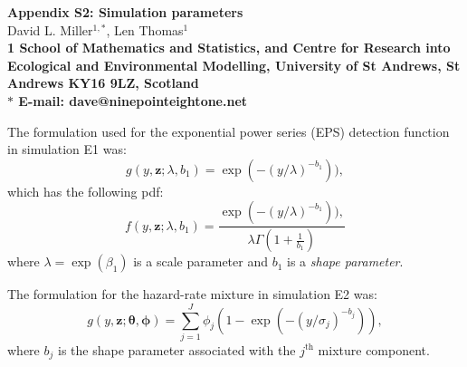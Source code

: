 \documentclass[10pt]{article}
\date{}
\begin{document}
\begin{flushleft}
{\Large
\textbf{Appendix S2: Simulation parameters}
}
\\
David L. Miller$^{1,\ast}$,
Len Thomas$^{1}$
\\
\bf{1} School of Mathematics and Statistics, and Centre for Research into Ecological and Environmental Modelling, University of St Andrews, St Andrews KY16 9LZ, Scotland
\\
$\ast$ E-mail: dave@ninepointeightone.net
\end{flushleft}

The formulation used for the exponential power series (EPS) detection function in simulation E1 was:
\begin{equation*}
g(y,\mathbf{z}; \lambda, b_1) =  \exp(-(y/\lambda)^{-b_1})),
\end{equation*}
which has the following pdf:
\begin{equation*}
f(y,\mathbf{z}; \lambda, b_1) =  \frac{\exp(-(y/\lambda)^{-b_1})),}{\lambda\Gamma(1+\frac{1}{b_1})}
\end{equation*}
where $\lambda=\exp(\beta_1)$ is a scale parameter and $b_1$ is a \textit{shape parameter}.

The formulation for the hazard-rate mixture in simulation E2 was:
\begin{equation*}
g(y,\mathbf{z}; \boldsymbol{\theta}, \boldsymbol{\phi}) = \sum_{j=1}^J \phi_j (1-\exp(-(y/\sigma_j)^{-b_j})),
\end{equation*}
where $b_j$ is the shape parameter associated with the $j^\text{th}$ mixture component.
\end{document}

